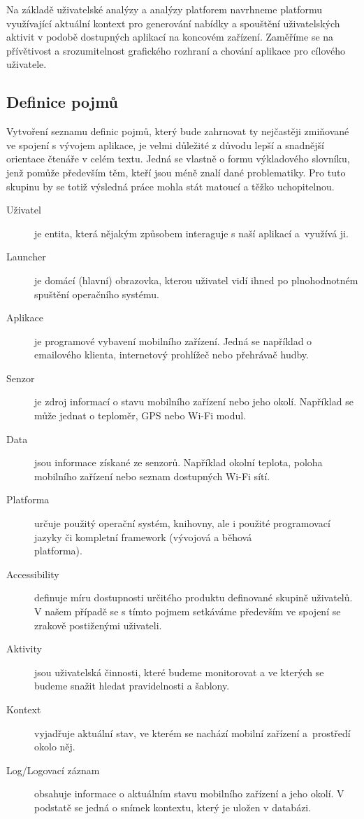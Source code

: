 \documentclass[thesis=M,czech]{FITthesis}[2012/06/26]
\begin{document}
\begin{introduction}
Na základě uživatelské analýzy a analýzy platforem navrhneme platformu využívající aktuální kontext pro generování nabídky a spouštění uživatelských aktivit v podobě dostupných aplikací na koncovém zařízení. Zaměříme se na přívětivost a srozumitelnost grafického rozhraní a chování aplikace pro cílového uživatele.

\subsection{Definice pojmů}

Vytvoření seznamu definic pojmů, který bude zahrnovat ty nejčastěji zmiňované ve spojení s vývojem aplikace, je velmi důležité z důvodu lepší a snadnější orientace čtenáře v celém textu. Jedná se vlastně o formu výkladového slovníku, jenž pomůže především těm, kteří jsou méně znalí dané problematiky. Pro tuto skupinu by se totiž výsledná práce mohla stát matoucí a těžko uchopitelnou.

\begin{description}
\item[Uživatel] je entita, která nějakým způsobem interaguje s naší aplikací a~využívá ji.
\item[Launcher] je domácí (hlavní) obrazovka, kterou uživatel vidí ihned po plnohodnotném spuštění operačního systému.\cite{launcher}
\item[Aplikace] je programové vybavení mobilního zařízení. Jedná se například o emailového klienta, internetový prohlížeč nebo přehrávač hudby.
\item[Senzor] je zdroj informací o stavu mobilního zařízení nebo jeho okolí. Například se může jednat o teploměr, GPS nebo Wi-Fi modul.
\item[Data] jsou informace získané ze senzorů. Například okolní teplota, poloha mobilního zařízení nebo seznam dostupných Wi-Fi sítí.
\item[Platforma] určuje použitý operační systém, knihovny, ale i použité programovací jazyky či kompletní framework (vývojová a běhová \\platforma).\cite{platform}
\item[Accessibility] definuje míru dostupnosti určitého produktu definované skupině uživatelů. V našem případě se s tímto pojmem setkáváme především ve spojení se zrakově postiženými uživateli.
\item[Aktivity] jsou uživatelská činnosti, které budeme monitorovat a ve kterých se budeme snažit hledat pravidelnosti a šablony.
\item[Kontext] vyjadřuje aktuální stav, ve kterém se nachází mobilní zařízení a~prostředí okolo něj.
\item[Log/Logovací záznam] obsahuje informace o aktuálním stavu mobilního zařízení a jeho okolí. V podstatě se jedná o snímek kontextu, který je uložen v databázi.
\end{description}


\end{introduction}
\end{document}

